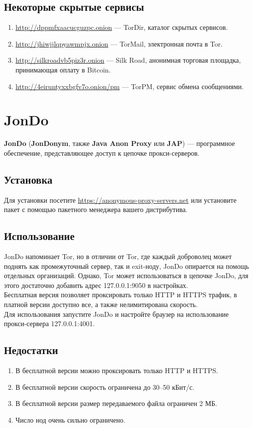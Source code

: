\subsection{Некоторые скрытые сервисы}
\begin{enumerate}
\item \url{http://dppmfxaacucguzpc.onion} --- TorDir, каталог скрытых сервисов.
\item \url{http://jhiwjjlqpyawmpjx.onion} --- TorMail, электронная почта в Tor.
\item \url{http://silkroadvb5piz3r.onion} --- Silk Road, анонимная торговая площадка, принимающая оплату в Bitcoin.
\item \url{http://4eiruntyxxbgfv7o.onion/pm} --- TorPM, сервис обмена сообщениями.
\end{enumerate}
\section{JonDo}
\textbf{JonDo} (\textbf{JonDonym}, также \textbf{Java Anon Proxy} или \textbf{JAP}) --- программное обеспечение, представляющее доступ к цепочке прокси-серверов.
\subsection{Установка}
Для установки посетите \url{https://anonymous-proxy-servers.net} или установите пакет с помощью пакетного менеджера вашего дистрибутива.
\subsection{Использование}
JonDo напоминает Tor, но в отличии от Tor, где каждый доброволец может поднять как промежуточный сервер, так и exit-ноду, JonDo опирается на помощь отдельных организаций. Однако, Tor может использоваться в цепочке JonDo, для этого достаточно добавить адрес 127.0.0.1:9050 в настройках.\\
Бесплатная версия позволяет проксировать только HTTP и HTTPS трафик, в платной версии доступно все, а также нелимитирована скорость.\\
Для использования запустите JonDo и настройте браузер на использование прокси-сервера 127.0.0.1:4001.
\subsection{Недостатки}
\begin{enumerate}
\item В бесплатной версии можно проксировать только HTTP и HTTPS.
\item В бесплатной версии скорость ограничена до 30--50 кБит/с.
\item В бесплатной версии размер передаваемого файла ограничен 2 МБ.
\item Число нод очень сильно ограничено.
\end{enumerate}
